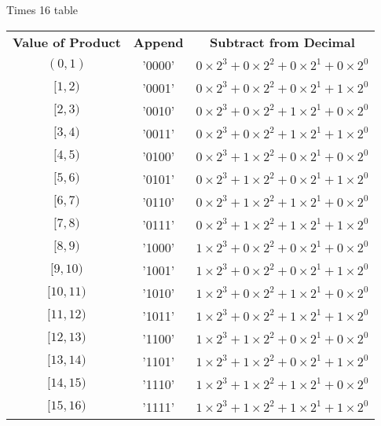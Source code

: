 \documentclass[12pt]{article}
\begin{document}
Times 16 table
\begin{center}
\begin{tabular}{c|c|c}
    \textbf{Value of Product} & \textbf{Append} & \textbf{Subtract from Decimal} \\
    $(0,1)$   & '0000' & $0\times2^3 + 0\times2^2 + 0\times2^1 + 0\times2^0$ \\
    $[1,2)$   & '0001' & $0\times2^3 + 0\times2^2 + 0\times2^1 + 1\times2^0$ \\
    $[2,3)$   & '0010' & $0\times2^3 + 0\times2^2 + 1\times2^1 + 0\times2^0$ \\
    $[3,4)$   & '0011' & $0\times2^3 + 0\times2^2 + 1\times2^1 + 1\times2^0$ \\
    $[4,5)$   & '0100' & $0\times2^3 + 1\times2^2 + 0\times2^1 + 0\times2^0$ \\
    $[5,6)$   & '0101' & $0\times2^3 + 1\times2^2 + 0\times2^1 + 1\times2^0$ \\
    $[6,7)$   & '0110' & $0\times2^3 + 1\times2^2 + 1\times2^1 + 0\times2^0$ \\
    $[7,8)$   & '0111' & $0\times2^3 + 1\times2^2 + 1\times2^1 + 1\times2^0$ \\
    $[8,9)$   & '1000' & $1\times2^3 + 0\times2^2 + 0\times2^1 + 0\times2^0$ \\
    $[9,10)$  & '1001' & $1\times2^3 + 0\times2^2 + 0\times2^1 + 1\times2^0$ \\
    $[10,11)$ & '1010' & $1\times2^3 + 0\times2^2 + 1\times2^1 + 0\times2^0$ \\
    $[11,12)$ & '1011' & $1\times2^3 + 0\times2^2 + 1\times2^1 + 1\times2^0$ \\
    $[12,13)$ & '1100' & $1\times2^3 + 1\times2^2 + 0\times2^1 + 0\times2^0$ \\
    $[13,14)$ & '1101' & $1\times2^3 + 1\times2^2 + 0\times2^1 + 1\times2^0$ \\
    $[14,15)$ & '1110' & $1\times2^3 + 1\times2^2 + 1\times2^1 + 0\times2^0$ \\
    $[15,16)$ & '1111' & $1\times2^3 + 1\times2^2 + 1\times2^1 + 1\times2^0$
\end{tabular}
\end{center}
\end{document}
